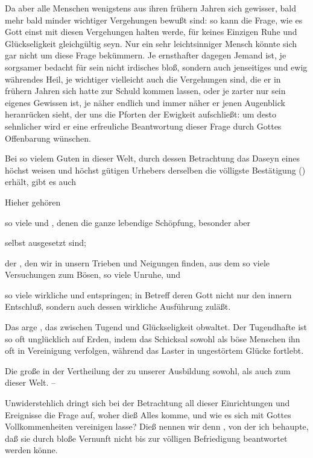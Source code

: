 \begin{aufza}
\item Da aber alle Menschen wenigstens aus ihren frühern Jahren sich gewisser, bald mehr bald minder wichtiger Vergehungen bewußt sind: so kann die Frage, wie es Gott einst mit diesen Vergehungen halten werde, für keines Einzigen Ruhe und Glückseligkeit gleichgültig seyn. Nur ein sehr leichtsinniger Mensch könnte sich gar nicht um diese Frage bekümmern. Je ernsthafter dagegen Jemand ist, je sorgsamer bedacht für sein nicht irdisches bloß, sondern auch jenseitiges und ewig währendes Heil, je wichtiger vielleicht auch die Vergehungen sind, die er in frühern Jahren sich hatte zur Schuld kommen lassen, oder je zarter nur sein eigenes Gewissen ist, je näher endlich und immer näher er jenen Augenblick heranrücken sieht, der uns die Pforten der Ewigkeit aufschließt: um desto sehnlicher wird er eine erfreuliche Beantwortung dieser Frage durch Gottes Offenbarung wünschen.
\end{aufza}
   
Bei so vielem Guten in dieser Welt, durch dessen Betrachtung das Daseyn eines höchst weisen und höchst gütigen Urhebers derselben die völligste Bestätigung () erhält, gibt es auch \par
Hieher gehören
\begin{aufzb}
\item so viele  und , denen die ganze lebendige Schöpfung, besonder aber
\item {} selbst ausgesetzt sind;
\item der , den wir in unsern Trieben und Neigungen finden, aus dem so viele Versuchungen zum Bösen, so viele Unruhe, und
\item so viele wirkliche  und  entspringen; in Betreff deren Gott nicht nur den innern Entschluß, sondern auch dessen wirkliche Ausführung zuläßt.
\item Das arge , das zwischen Tugend und Glückseligkeit obwaltet. Der Tugendhafte ist so oft unglücklich auf Erden, indem das Schicksal sowohl als böse Menschen ihn oft in Vereinigung verfolgen, während das Laster in ungestörtem Glücke fortlebt.~
\item Die große  in der Vertheilung der  zu unserer  Ausbildung sowohl, als auch zum  dieser Welt. -- 
\end{aufzb}
Unwiderstehlich dringt sich bei der Betrachtung all dieser Einrichtungen und Ereignisse die Frage auf, woher dieß Alles komme, und wie es sich mit Gottes Vollkommenheiten vereinigen lasse? Dieß nennen wir denn , von der ich behaupte, daß sie durch bloße Vernunft nicht bis zur völligen Befriedigung beantwortet werden könne.


